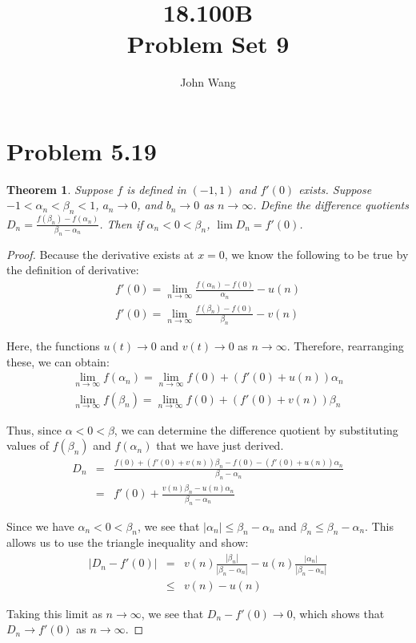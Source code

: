 \documentclass[psamsfonts]{amsart}
\title{18.100B \\
Problem Set 9}
\author{John Wang}
\newtheorem{thm}{Theorem}[section]
\theoremstyle{definition}
\theoremstyle{remark}
\numberwithin{equation}{section}
\begin{document}
\maketitle

\section{Problem 5.19}

\begin{thm}
Suppose $f$ is defined in $(-1,1)$ and $f'(0)$ exists. Suppose $-1 < \alpha_n < \beta_n < 1$, $a_n \to 0$, and $b_n \to 0$ as $n \to \infty$. Define the difference quotients $D_n = \frac{f(\beta_n) - f( \alpha_n)}{\beta_n - \alpha_n}$. Then if $\alpha_n < 0 < \beta_n$, $\lim D_n = f'(0)$. 
\end{thm}

\begin{proof}
Because the derivative exists at $x = 0$, we know the following to be true by the definition of derivative:
\begin{eqnarray}
f'(0) = \lim_{n \to \infty } \frac{f(\alpha_n) - f(0) }{\alpha_n } - u(n)\\
f'(0) = \lim_{n \to \infty} \frac{f(\beta_n) - f(0)}{ \beta_n}- v(n)
\end{eqnarray}

Here, the functions $u(t) \to 0$ and $v(t) \to 0$ as $n \to \infty$. Therefore, rearranging these, we can obtain:
\begin{eqnarray}
\lim_{n \to \infty} f(\alpha_n) = \lim_{n \to \infty} f(0) + (f'(0) + u(n)) \alpha_n \\
\lim_{n \to \infty} f(\beta_n) = \lim_{n \to \infty} f(0) + (f'(0) + v(n)) \beta_n
\end{eqnarray}

Thus, since $\alpha < 0 < \beta$, we can determine the difference quotient by substituting values of $f(\beta_n)$ and $f(\alpha_n)$ that we have just derived.
\begin{eqnarray}
D_n &=& \frac{f(0) + (f'(0) + v(n)) \beta_n - f(0) - (f'(0) + u(n)) \alpha_n}{\beta_n - \alpha_n} \\
&=& f'(0) + \frac{v(n) \beta_n - u(n) \alpha_n}{\beta_n - \alpha_n}
\end{eqnarray}

Since we have $\alpha_n < 0 < \beta_n$, we see that $|\alpha_n| \leq \beta_n - \alpha_n$ and $\beta_n \leq \beta_n - \alpha_n$. This allows us to use the triangle inequality and show:
\begin{eqnarray}
|D_n - f'(0)| &=& v(n) \frac{|\beta_n|}{|\beta_n - \alpha_n|} - u(n)\frac{| \alpha_n|}{|\beta_n - \alpha_n|} \\
&\leq & v(n) - u(n) 
\end{eqnarray}

Taking this limit as $n \to \infty$, we see that $D_n - f'(0) \to 0$, which shows that $D_n \to f'(0)$ as $n \to \infty$. 
\end{proof}
\end{document}
